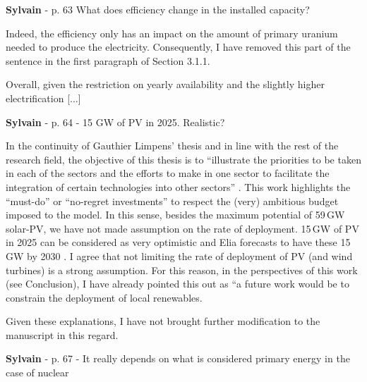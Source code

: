 \documentclass[12pt,a4paper]{article}
\begin{document}
\begin{mdframed}[style=comment] %
{\color{purple} \textbf{Sylvain}} - p. 63 What does efficiency change in the installed capacity?
\end{mdframed}

\noindent Indeed, the efficiency only has an impact on the amount of primary uranium needed to produce the electricity. Consequently, I have removed this part of the sentence {\color{blue}in the first paragraph of Section 3.1.1}. 

\begin{mdframed}[style=manuscript] %
Overall, given the restriction on yearly availability and the slightly higher electrification [...]
\end{mdframed}

\begin{mdframed}[style=comment] %
{\color{purple} \textbf{Sylvain}} - p. 64 - 15 GW of PV in 2025. Realistic?
\end{mdframed}

\noindent In the continuity of Gauthier Limpens' thesis  and in line with the rest of the research field, the objective of this thesis is to ``illustrate the priorities to be taken in each of the sectors and the efforts to make in one sector to facilitate the integration of certain technologies into other sectors'' \cite{limpens2021generating}. This work highlights the ``must-do'' or ``no-regret investments'' to respect the (very) ambitious  budget imposed to the model. In this sense, besides the maximum potential of 59\,GW solar-PV, we have not made assumption on the rate of deployment. 15\,GW of PV in 2025 can be considered as very optimistic and Elia forecasts to have these 15\,GW by 2030 \cite{Elia_2024_2034}. I agree that not limiting the rate of deployment of PV (and wind turbines) is a strong assumption. For this reason, in the perspectives of this work (see Conclusion), I have already pointed this out as ``a future work would be to constrain the deployment of local renewables.

Given these explanations, I have not brought further modification to the manuscript in this regard.

\begin{mdframed}[style=comment] %
{\color{purple} \textbf{Sylvain}} - p. 67 - It really depends on what is considered primary energy in the case of nuclear
\end{mdframed}
\end{document}

